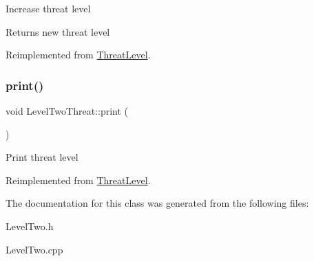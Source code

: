 Increase threat level \begin{DoxyReturn}{Returns}
new threat level 
\end{DoxyReturn}


Reimplemented from \hyperlink{classThreatLevel_ae18f6ebe2186ae1b61d4817196f969e3}{Threat\+Level}.

\mbox{\label{classLevelTwoThreat_a9e21bc1a55bb25d86346c484f5fd0525}} 
\subsubsection{\texorpdfstring{print()}{print()}}
{\footnotesize\ttfamily void Level\+Two\+Threat\+::print (\begin{DoxyParamCaption}{ }\end{DoxyParamCaption})\hspace{0.3cm}{\ttfamily [virtual]}}

Print threat level 

Reimplemented from \hyperlink{classThreatLevel_a5bdff5eeffed8db616ca06091097c138}{Threat\+Level}.



The documentation for this class was generated from the following files\+:\begin{DoxyCompactItemize}
\item 
Level\+Two.\+h\item 
Level\+Two.\+cpp\end{DoxyCompactItemize}
